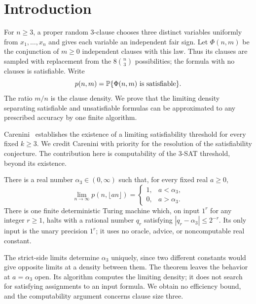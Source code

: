\section{Introduction}\label{sec:introduction}

For $n\ge3$, a proper random 3-clause chooses three distinct variables
uniformly from $x_1,\ldots,x_n$ and gives each variable an independent
fair sign. Let $\Phi(n,m)$ be the conjunction of $m\ge0$ independent
clauses with this law. Thus its clauses are sampled with replacement
from the $8\binom n3$ possibilities; the formula with no clauses is
satisfiable. Write
\[
 p(n,m)=\mathbb P\{\Phi(n,m)\text{ is satisfiable}\}.
\]
The ratio $m/n$ is the clause density. We prove that the limiting density
separating satisfiable and unsatisfiable formulas can be approximated to
any prescribed accuracy by one finite algorithm.

Carenini~\cite[Corollary~1.2]{Carenini2026Polynomial} establishes the
existence of a limiting satisfiability threshold for every fixed
$k\ge3$. We credit Carenini with priority for the resolution of the
satisfiability conjecture. The contribution here is computability of
the 3-SAT threshold, beyond its existence.

\begin{theorem}\label{thm:main}
There is a real number $\alpha_3\in(0,\infty)$ such that, for every fixed
real $a\ge0$,
\[
 \lim_{n\to\infty}p(n,\lfloor an\rfloor)=
 \begin{cases}1,&a<\alpha_3,\\0,&a>\alpha_3.\end{cases}
\]
There is one finite deterministic Turing machine which, on input $1^r$
for any integer $r\ge1$, halts with a rational number $q_r$ satisfying
$|q_r-\alpha_3|\le2^{-r}$. Its only input is the unary precision $1^r$;
it uses no oracle, advice, or noncomputable real constant.
\end{theorem}

The strict-side limits determine $\alpha_3$ uniquely, since two different
constants would give opposite limits at a density between them. The
theorem leaves the behavior at $a=\alpha_3$ open. Its algorithm computes
the limiting density; it does not search for satisfying assignments to
an input formula. We obtain no efficiency bound, and the computability
argument concerns clause size three.

